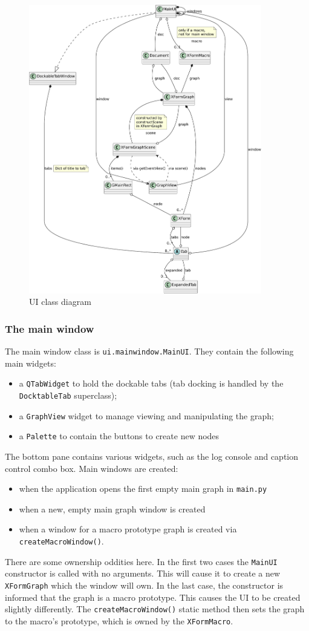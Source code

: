 \begin{figure}[ht]
\center
\includegraphics[width=4in]{ui.pdf}
\caption{UI class diagram}
\label{ui.pdf}
\end{figure}


\clearpage
\subsubsection{The main window}
The main window class is \texttt{ui.mainwindow.MainUI}. They contain the
following main widgets:
\begin{itemize}
\item a \texttt{QTabWidget} to hold the dockable tabs (tab docking is
handled by the \texttt{DocktableTab} superclass);
\item a \texttt{GraphView} widget to manage viewing and manipulating
the graph;
\item a \texttt{Palette} to contain the buttons to create new nodes
\end{itemize}
The bottom pane contains various widgets, such as the log console and
caption control combo box.
Main windows are created:
\begin{itemize}
\item when the application opens the first empty main graph in \texttt{main.py}
\item when a new, empty main graph window is created
\item when a window for a macro prototype graph is created
via \texttt{createMacroWindow()}.
\end{itemize}
There are some ownership oddities here. In the first two cases
the \texttt{MainUI} constructor is called with no arguments. This will
cause it to create a new \texttt{XFormGraph} which the window will own.
In the last case, the constructor is informed that the graph is a macro
prototype. This causes the UI to be created slightly differently. 
The \texttt{createMacroWindow()} static method then sets the graph to the macro's
prototype, which is owned by the \texttt{XFormMacro}.

